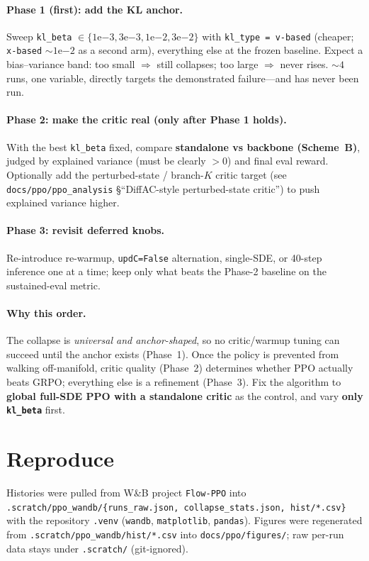 \documentclass[11pt]{article}
\newcommand{\code}[1]{\texttt{#1}}
\begin{document}
\paragraph{Phase 1 (first): add the KL anchor.}
Sweep \code{kl\_beta} $\in\{1\mathrm{e}{-3},3\mathrm{e}{-3},1\mathrm{e}{-2},3\mathrm{e}{-2}\}$
with \code{kl\_type = v-based} (cheaper; \code{x-based} ${\sim}1\mathrm{e}{-2}$ as a second
arm), everything else at the frozen baseline. Expect a bias--variance band: too small
$\Rightarrow$ still collapses; too large $\Rightarrow$ never rises. ${\sim}4$ runs, one
variable, directly targets the demonstrated failure---and has never been run.

\paragraph{Phase 2: make the critic real (only after Phase 1 holds).}
With the best \code{kl\_beta} fixed, compare \textbf{standalone vs backbone (Scheme~B)},
judged by explained variance (must be clearly $>0$) and final eval reward. Optionally add
the perturbed-state / branch-$K$ critic target (see \code{docs/ppo/ppo\_analysis}
\S``DiffAC-style perturbed-state critic'') to push explained variance higher.

\paragraph{Phase 3: revisit deferred knobs.}
Re-introduce re-warmup, \code{updC=False} alternation, single-SDE, or 40-step inference
one at a time; keep only what beats the Phase-2 baseline on the sustained-eval metric.

\paragraph{Why this order.}
The collapse is \emph{universal and anchor-shaped}, so no critic/warmup tuning can succeed
until the anchor exists (Phase~1). Once the policy is prevented from walking off-manifold,
critic quality (Phase~2) determines whether PPO actually beats GRPO; everything else is a
refinement (Phase~3). Fix the algorithm to \textbf{global full-SDE PPO with a standalone
critic} as the control, and vary \textbf{only \code{kl\_beta}} first.

\section*{Reproduce}
Histories were pulled from W\&B project \code{Flow-PPO} into
\code{.scratch/ppo\_wandb/\{runs\_raw.json, collapse\_stats.json, hist/*.csv\}} with the
repository \code{.venv} (\code{wandb}, \code{matplotlib}, \code{pandas}). Figures were
regenerated from \code{.scratch/ppo\_wandb/hist/*.csv} into \code{docs/ppo/figures/}; raw
per-run data stays under \code{.scratch/} (git-ignored).
\end{document}
